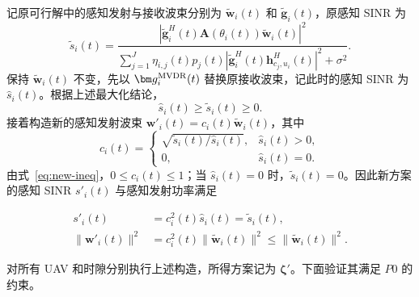 记原可行解中的感知发射与接收波束分别为 $\tilde{\bm w}_i(t)$ 和 $\tilde{\bm g}_i(t)$，原感知 SINR 为
\begin{equation}\label{eq:new-old-sinr}
\tilde s_i(t)=\frac{\left|\tilde{\bm g}_i^H(t)\mathbf A(\theta_i(t))\tilde{\bm w}_i(t)\right|^2}{\displaystyle\sum_{j=1}^{J}\eta_{i,j}(t)p_j(t)\left|\tilde{\bm g}_i^H(t)\bm h_{c_j,u_i}^{H}(t)\right|^2+\sigma^2}.
\end{equation}
保持 $\tilde{\bm w}_i(t)$ 不变，先以 $\bm g_i^{\rm MVDR}(t)$ 替换原接收波束，记此时的感知 SINR 为 $\hat s_i(t)$。根据上述最大化结论，
\begin{equation}\label{eq:new-ineq}
\hat s_i(t)\ge\tilde s_i(t)\ge0.
\end{equation}
接着构造新的感知发射波束 $\bm w'_i(t)=c_i(t)\tilde{\bm w}_i(t)$，其中
\begin{equation}\label{eq:new-scale}
c_i(t)=\begin{cases}
\sqrt{\tilde s_i(t)/\hat s_i(t)},&\hat s_i(t)>0,\\
0,&\hat s_i(t)=0.
\end{cases}
\end{equation}
由式~\eqref{eq:new-ineq}，$0\le c_i(t)\le1$；当 $\hat s_i(t)=0$ 时，$\tilde s_i(t)=0$。因此新方案的感知 SINR $s'_i(t)$ 与感知发射功率满足
\begin{samepage}
\begin{align}\label{eq:new-same-sinr}
s'_i(t)&=c_i^2(t)\hat s_i(t)=\tilde s_i(t),\\
\|\bm w'_i(t)\|^2&=c_i^2(t)\|\tilde{\bm w}_i(t)\|^2\le\|\tilde{\bm w}_i(t)\|^2.\label{eq:new-power}
\end{align}
\end{samepage}
对所有 UAV 和时隙分别执行上述构造，所得方案记为 $\bm\zeta'$。下面验证其满足 $P0$ 的约束。

